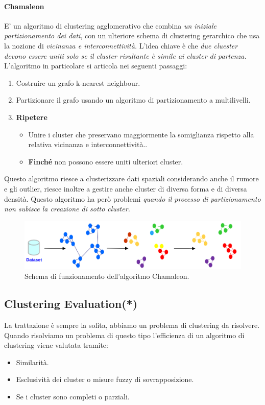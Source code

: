 \paragraph{Chamaleon} E' un algoritmo di clustering agglomerativo che combina \textit{un iniziale partizionamento dei dati}, con un ulteriore schema di clustering gerarchico che usa la nozione di \textit{vicinanza e interconnettività.} L'idea chiave è che \textit{due cluester devono essere uniti solo se il cluster risultante è simile ai cluster di partenza.}
L'algoritmo in particolare si articola nei seguenti passaggi:
\begin{enumerate}
	\item Costruire un grafo k-nearest neighbour.
	\item Partizionare il grafo usando un algoritmo di partizionamento a multilivelli.
	\item \textbf{Ripetere}
	\begin{itemize}
		\item Unire i cluster che preservano maggiormente la somiglianza rispetto alla relativa vicinanza e interconnettività..
		\item \textbf{Finché} non possono essere uniti ulteriori cluster.
	\end{itemize}
	
\end{enumerate}

Questo algoritmo riesce a clusterizzare dati spaziali considerando anche il rumore e gli outlier, riesce inoltre a gestire anche cluster di diversa forma e di diversa densità. Questo algoritmo ha però problemi \textit{quando il processo di partizionamento non subisce la creazione di sotto cluster.}
\begin{figure}[H]
	\centering
	\includegraphics[height=0.18 \linewidth]{clustering/pict/chamaleon.png}
	\caption{Schema di funzionamento dell'algoritmo Chamaleon.}
\end{figure}

\subsection{Clustering Evaluation(*)}
La trattazione è sempre la solita, abbiamo un problema di clustering da risolvere. Quando risolviamo un problema di questo tipo l'efficienza di un algoritmo di clustering viene valutata tramite:
\begin{itemize}
	\item Similarità.
	\item Esclusività dei cluster o misure fuzzy di sovrapposizione.
	\item Se i cluster sono completi o parziali.
\end{itemize}


